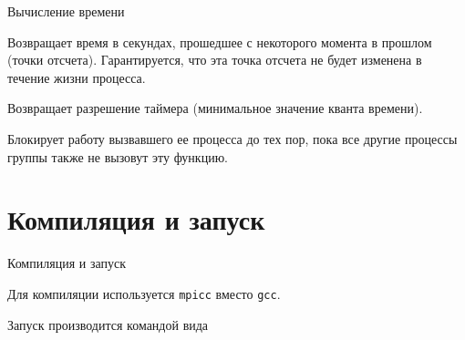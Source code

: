


\begin{frame}{Вычисление времени}

\wtime

Возвращает время в секундах, прошедшее с  некоторого момента в прошлом (точки отсчета). Гарантируется, что эта точка отсчета не будет изменена в течение жизни процесса.

\wtick

Возвращает разрешение таймера (минимальное значение кванта времени). 

\barrier

Блокирует работу вызвавшего ее процесса до тех пор, пока все другие процессы группы также не вызовут эту функцию.

\end{frame}

\section{Компиляция и запуск}


\begin{frame}{Компиляция и запуск}

Для компиляции используется \texttt{mpicc} вместо \texttt{gcc}.

\vfill

Запуск производится командой вида

\mpirun

\end{frame}

